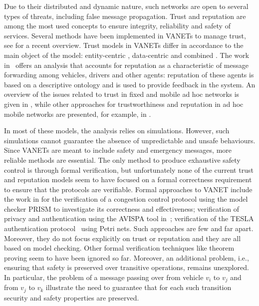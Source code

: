 \documentclass[compsoc, conference, letterpaper, 10pt, times]{IEEEtran}
\begin{document}
Due to their distributed and dynamic nature, such networks are open to several types of threats, including false message propagation. Trust and reputation are among the  most used concepts to ensure integrity, reliability and safety of services. Several methods have been implemented in VANETs to manage trust, see \cite{Soleymani2015} for a recent overview. Trust models in VANETs differ in accordance to the main object of the model: entity-centric \cite{5641621, GomezMarmol:2012:TTR:2160992.2161100}, data-centric \cite{conf/infocom/RayaPGH08, Lo2009} and combined \cite{Wei2012}. The work in~\cite{glenford} offers an analysis that accounts for reputation as a characteristic of message forwarding among vehicles, drivers and other agents: reputation of these agents is based on a descriptive ontology and is used to provide feedback in the system. An overview of the issues related to trust in fixed and mobile ad hoc networks is given in \cite{DBLP:conf/vtc/WexBHLD08}, while other approaches for trustworthiness and reputation in ad hoc mobile networks are presented, for example, in \cite{DBLP:conf/um/FinnsonZTMC12, DBLP:journals/ijaisc/ChaurasiaTV15}.

In most of these models, the analysis relies on simulations. However, such simulations cannot guarantee the absence of unpredictable and unsafe behaviours. Since VANETs are meant to include safety and emergency messages, more reliable methods are essential. The only method to produce exhaustive safety control is through formal verification, but unfortunately none of the current trust and reputation models seem to have focused on a formal correctness requirement to ensure that the protocols are verifiable. Formal approaches to VANET include the work in \cite{DBLP:conf/vtc/KonurF11} for the verification of a congestion control protocol using the model checker PRISM to investigate its correctness and effectiveness; verification of privacy and authentication using the AVISPA tool in~\cite{bouassida2011authentication}; verification of the TESLA authentication protocol~\cite{tesla-cpn} using Petri nets.  Such approaches are few and far apart. Moreover, they do not focus explicitly on trust or reputation and they are all based on model checking. Other formal verification techniques like theorem proving seem to have been ignored so far. Moreover, an additional problem, i.e., ensuring that safety is preserved over transitive operations, remains unexplored. In particular, the problem of a message passing over from vehicle $v_{i}$ to $v_{j}$ and from $v_j$ to $v_{k}$ illustrate the need to guarantee that for each such transition security and safety properties are preserved.
\end{document}
